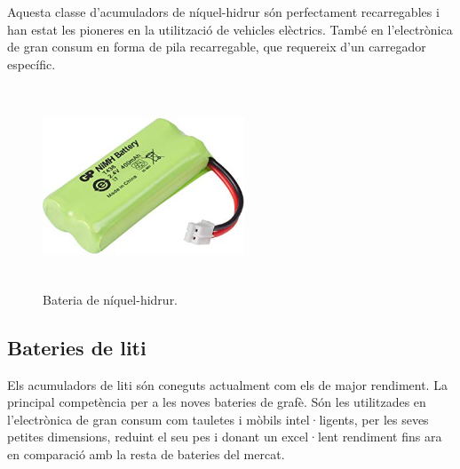 Aquesta classe d’acumuladors de níquel-hidrur són perfectament recarregables i han estat les pioneres en la utilització de vehicles elèctrics. \newline També en l’electrònica de gran consum en forma de pila recarregable, que requereix d'un carregador específic.
\begin{figure}[H]
	\centering
    \includegraphics[width=6cm, height=6cm] {Bateries/niquelhidrur.jpg}
    \caption{Bateria de níquel-hidrur.}
\end{figure}

\subsection{Bateries de liti}
Els acumuladors de liti són coneguts actualment com els de major rendiment. La principal competència per a les noves bateries de grafè. Són les utilitzades en l'electrònica de gran consum com tauletes i mòbils intel·ligents, per les seves petites dimensions, reduint el seu pes i donant un excel·lent rendiment fins ara en comparació amb la resta de bateries del mercat.

